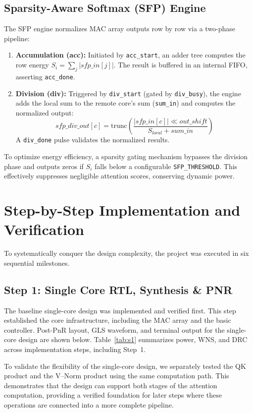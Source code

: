 \documentclass[journal]{IEEEtran}
\begin{document}
\subsection{Sparsity-Aware Softmax (SFP) Engine}
The SFP engine normalizes MAC array outputs row by row via a two-phase pipeline:
\begin{enumerate}
    \item \textbf{Accumulation (acc):} Initiated by \texttt{acc\_start}, an adder tree computes the row energy $S_{i} = \sum_{j} |sfp\_in[j]|$. The result is buffered in an internal FIFO, asserting \texttt{acc\_done}.
    \item \textbf{Division (div):} Triggered by \texttt{div\_start} (gated by \texttt{div\_busy}), the engine adds the local sum to the remote core's sum (\texttt{sum\_in}) and computes the normalized output:
    \begin{equation}
        sfp\_div\_out[c] = \text{trunc}\left(\frac{|sfp\_in[c]| \ll out\_shift}{S_{local} + sum\_in}\right)
    \end{equation}
    A \texttt{div\_done} pulse validates the normalized results.
\end{enumerate}
To optimize energy efficiency, a sparsity gating mechanism bypasses the division phase and outputs zeros if $S_{i}$ falls below a configurable \texttt{SFP\_THRESHOLD}. This effectively suppresses negligible attention scores, conserving dynamic power.

\section{Step-by-Step Implementation and Verification}
To systematically conquer the design complexity, the project was executed in six sequential milestones.

\subsection{Step 1: Single Core RTL, Synthesis \& PNR}
The baseline single-core design was implemented and verified first. This step established the core infrastructure, including the MAC array and the basic controller.
Post-PnR layout, GLS waveform, and terminal output for the single-core design are shown below. Table~\ref{tab:s1} summarizes power, WNS, and DRC across implementation steps, including Step~1.

To validate the flexibility of the single-core design, we separately tested the QK product and the V--Norm product using the same computation path. This demonstrates that the design can support both stages of the attention computation, providing a verified foundation for later steps where these operations are connected into a more complete pipeline.
\end{document}
